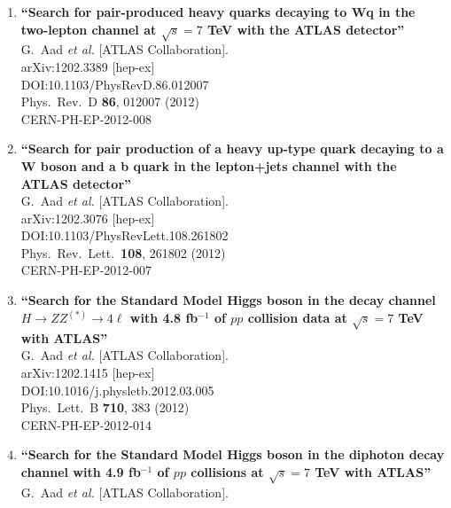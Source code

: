 \documentclass{article}
\begin{document}
\begin{enumerate}
\item%
{\bf ``Search for pair-produced heavy quarks decaying to Wq in the two-lepton channel at $\sqrt{s}=7$ TeV with the ATLAS detector''}
  \\{}G.~Aad {\it et al.} [ATLAS Collaboration].
  \\{}arXiv:1202.3389 [hep-ex]
  \\{}DOI:10.1103/PhysRevD.86.012007
  \\{}Phys.\ Rev.\ D {\bf 86}, 012007 (2012)
  \\{}CERN-PH-EP-2012-008
\item%
{\bf ``Search for pair production of a heavy up-type quark decaying to a W boson and a b quark in the lepton+jets channel with the ATLAS detector''}
  \\{}G.~Aad {\it et al.} [ATLAS Collaboration].
  \\{}arXiv:1202.3076 [hep-ex]
  \\{}DOI:10.1103/PhysRevLett.108.261802
  \\{}Phys.\ Rev.\ Lett.\  {\bf 108}, 261802 (2012)
  \\{}CERN-PH-EP-2012-007
\item%
{\bf ``Search for the Standard Model Higgs boson in the decay channel $H \to ZZ^{(*)} \to 4 \ell$ with 4.8 fb$^{-1}$ of $pp$ collision data at $\sqrt{s}=7$ TeV with ATLAS''}
  \\{}G.~Aad {\it et al.} [ATLAS Collaboration].
  \\{}arXiv:1202.1415 [hep-ex]
  \\{}DOI:10.1016/j.physletb.2012.03.005
  \\{}Phys.\ Lett.\ B {\bf 710}, 383 (2012)
  \\{}CERN-PH-EP-2012-014
\item%
{\bf ``Search for the Standard Model Higgs boson in the diphoton decay channel with 4.9 fb$^{-1}$ of $pp$ collisions at $\sqrt{s}=7$ TeV with ATLAS''}
  \\{}G.~Aad {\it et al.} [ATLAS Collaboration].

\end{enumerate}
\end{document}
